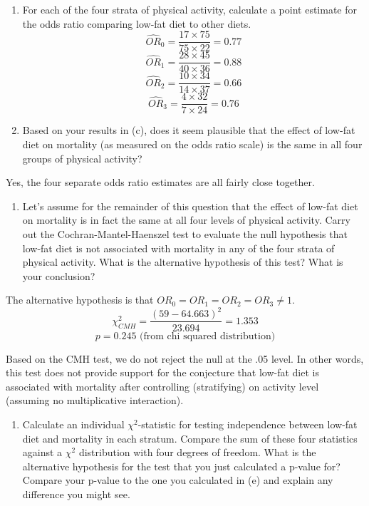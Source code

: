 \documentclass[]{article}
\providecommand{\tightlist}{%
  \setlength{\itemsep}{0pt}\setlength{\parskip}{0pt}}
\begin{document}
\begin{enumerate}
\def\labelenumi{(\alph{enumi})}
\setcounter{enumi}{2}
\item
  For each of the four strata of physical activity, calculate a point
  estimate for the odds ratio comparing low-fat diet to other diets.
  \[\hat{OR}_0  = \frac{17 \times 75}{75 \times 22} = 0.77\]
  \[\hat{OR}_1  = \frac{28 \times 45}{40 \times 36} = 0.88\]
  \[\hat{OR}_2  = \frac{10 \times 34}{14 \times 37} = 0.66\]
  \[\hat{OR}_3  = \frac{4 \times 32}{7 \times 24} = 0.76\]
\item
  Based on your results in (c), does it seem plausible that the effect
  of low-fat diet on mortality (as measured on the odds ratio scale) is
  the same in all four groups of physical activity?
\end{enumerate}

Yes, the four separate odds ratio estimates are all fairly close
together.

\begin{enumerate}
\def\labelenumi{(\alph{enumi})}
\setcounter{enumi}{4}
\tightlist
\item
  Let's assume for the remainder of this question that the effect of
  low-fat diet on mortality is in fact the same at all four levels of
  physical activity. Carry out the Cochran-Mantel-Haenszel test to
  evaluate the null hypothesis that low-fat diet is not associated with
  mortality in any of the four strata of physical activity. What is the
  alternative hypothesis of this test? What is your conclusion?
\end{enumerate}

The alternative hypothesis is that \(OR_0 = OR_1 = OR_2 = OR_3 \neq 1\).
\[\chi^2_{CMH} = \frac{(59 - 64.663)^2}{23.694} = 1.353\]
\[p = 0.245 \text{ (from chi squared distribution)}\]

Based on the CMH test, we do not reject the null at the .05 level. In
other words, this test does not provide support for the conjecture that
low-fat diet is associated with mortality after controlling
(stratifying) on activity level (assuming no multiplicative
interaction).

\begin{enumerate}
\def\labelenumi{(\alph{enumi})}
\setcounter{enumi}{5}
\tightlist
\item
  Calculate an individual \(\chi^2\)-statistic for testing independence
  between low-fat diet and mortality in each stratum. Compare the sum of
  these four statistics against a \(\chi^2\) distribution with four
  degrees of freedom. What is the alternative hypothesis for the test
  that you just calculated a p-value for? Compare your p-value to the
  one you calculated in (e) and explain any difference you might see.
\end{enumerate}
\end{document}

